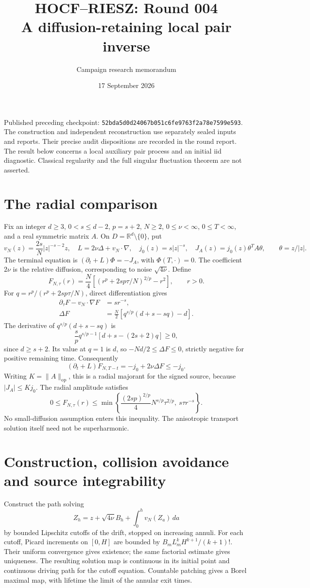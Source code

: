 \documentclass[11pt]{article}
\title{HOCF--RIESZ: Round 004\\A diffusion-retaining local pair inverse}
\author{Campaign research memorandum}
\date{17 September 2026}
\begin{document}
\maketitle
\noindent Published preceding checkpoint:
\texttt{52bda5d0d24067b051c6fe9763f2a78e7599e593}.
The construction and independent reconstruction use separately sealed
inputs and reports. Their precise audit dispositions are recorded in the
round report. The result below concerns a local auxiliary pair process
and an initial iid diagnostic. Classical regularity and the full singular
fluctuation theorem are not asserted.

\section{The radial comparison}
Fix an integer $d\ge3$, $0<s\le d-2$, $p=s+2$, $N\ge2$,
$0\le\nu<\infty$, $0\le T<\infty$, and a real symmetric matrix $A$.
On $D=\mathbb R^d\setminus\{0\}$, put
\[
 v_N(z)=\frac{2s}{N}|z|^{-s-2}z,\quad
 L=2\nu\Delta+v_N\cdot\nabla,\quad
 j_0(z)=s|z|^{-s},\quad J_A(z)=j_0(z)\theta^TA\theta,
 \qquad\theta=z/|z|.
\]
The terminal equation is $(\partial_t+L)\Phi=-J_A$, with
$\Phi(T,\cdot)=0$. The coefficient $2\nu$ is the relative diffusion,
corresponding to noise $\sqrt{4\nu}$. Define
\[
 F_{N,\tau}(r)=\frac N4\left[
 (r^p+2sp\tau/N)^{2/p}-r^2\right],\qquad r>0.
\]
For $q=r^p/(r^p+2sp\tau/N)$, direct differentiation gives
\begin{align}
 \partial_\tau F-v_N\cdot\nabla F&=sr^{-s},\\
 \Delta F&=\frac N2\left[q^{s/p}(d+s-sq)-d\right].\label{lap}
\end{align}
The derivative of $q^{s/p}(d+s-sq)$ is
\[
 \frac{s}{p}q^{s/p-1}[d+s-(2s+2)q]\ge0,
\]
since $d\ge s+2$. Its value at $q=1$ is $d$, so
$-Nd/2\le\Delta F\le0$, strictly negative for positive remaining time.
Consequently
\[
 (\partial_t+L)F_{N,T-t}=-j_0+2\nu\Delta F\le-j_0.
\]
Writing $K=\|A\|_{\mathrm{op}}$, this is a radial majorant for the
signed source, because $|J_A|\le K j_0$. The radial amplitude satisfies
\begin{equation}\label{bounds}
 0\le F_{N,\tau}(r)\le
 \min\left\{\frac{(2sp)^{2/p}}4N^{s/p}\tau^{2/p},\ s\tau r^{-s}\right\}.
\end{equation}
No small-diffusion assumption enters this inequality. The anisotropic
transport solution itself need not be superharmonic.

\section{Construction, collision avoidance and source integrability}
Construct the path solving
\[
 Z_h=z+\sqrt{4\nu}B_h+\int_0^h v_N(Z_a)\,da
\]
by bounded Lipschitz cutoffs of the drift, stopped on increasing annuli.
For each cutoff, Picard increments on $[0,H]$ are bounded by
$B_mL_m^kH^{k+1}/(k+1)!$. Their uniform convergence gives existence;
the same factorial estimate gives uniqueness. The resulting solution
map is continuous in its initial point and continuous driving path for
the cutoff equation. Countable patching gives a Borel maximal map,
with lifetime the limit of the annular exit times.
\end{document}
